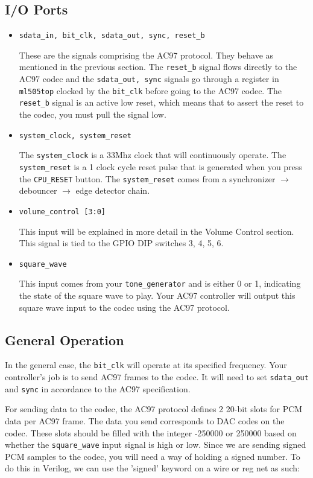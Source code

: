 \documentclass[11pt]{article}
\begin{document}
\subsection{I/O Ports}
\begin{itemize}
	\item \verb|sdata_in, bit_clk, sdata_out, sync, reset_b| 
	
	These are the signals comprising the AC97 protocol. They behave as mentioned in the previous section. The \verb|reset_b| signal flows directly to the AC97 codec and the \verb|sdata_out, sync| signals go through a register in \verb|ml505top| clocked by the \verb|bit_clk| before going to the AC97 codec. The \verb|reset_b| signal is an active low reset, which means that to assert the reset to the codec, you must pull the signal low.
	
	\item \verb|system_clock, system_reset|
	
	The \verb|system_clock| is a 33Mhz clock that will continuously operate. The \verb|system_reset| is a 1 clock cycle reset pulse that is generated when you press the \verb|CPU_RESET| button. The \verb|system_reset| comes from a synchronizer $\rightarrow$ debouncer $\rightarrow$ edge detector chain.
	
	\item \verb|volume_control [3:0]|
	
	This input will be explained in more detail in the Volume Control section. This signal is tied to the GPIO DIP switches 3, 4, 5, 6.
	
	\item \verb|square_wave|
	
	This input comes from your \verb|tone_generator| and is either 0 or 1, indicating the state of the square wave to play. Your AC97 controller will output this square wave input to the codec using the AC97 protocol.
\end{itemize}

\subsection{General Operation}

In the general case, the \verb|bit_clk| will operate at its specified frequency. Your controller's job is to send AC97 frames to the codec. It will need to set \verb|sdata_out| and \verb|sync| in accordance to the AC97 specification.

For sending data to the codec, the AC97 protocol defines 2 20-bit slots for PCM data per AC97 frame. The data you send corresponds to DAC codes on the codec. These slots should be filled with the integer -250000 or 250000 based on whether the \verb|square_wave| input signal is high or low. Since we are sending signed PCM samples to the codec, you will need a way of holding a signed number. To do this in Verilog, we can use the 'signed' keyword on a wire or reg net as such:
\end{document}
